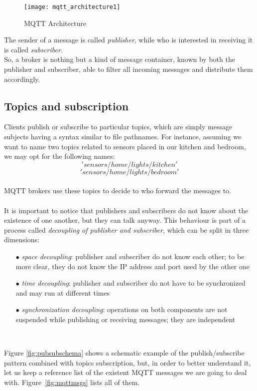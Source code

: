 \documentclass[12pt]{report}
\begin{document}
\begin{figure}[H]
\texttt{[image: mqtt\_architecture1]}
\caption{MQTT Architecture}
\label{fig:mqttArchitecture}
\end{figure}

The sender of a message is called \emph{publisher}, while who is interested in receiving it is called \emph{subscriber}.\\
So, a broker is nothing but a kind of message container, known by both the publisher and subscriber, able to filter all incoming messages and distribute them accordingly.\\

\subsection{Topics and subscription}
\label{ssec:topicsandsub}
\bigskip
Clients publish or subscribe to particular topics, which are simply message subjects having a syntax similar to file pathnames. For instance, assuming we want to name two topics related to sensors placed in our kitchen and bedroom, we may opt for the following names: $$'sensors/home/lights/kitchen'$$ $$'sensors/home/lights/bedroom'$$\\
MQTT brokers use these topics to decide to who forward the messages to.\\\\ 
It is important to notice that publishers and subscribers do not know about the existence of one another, but they can talk anyway.
This behaviour is part of a process called \emph{decoupling of publisher and subscriber}, which can be split in three dimensions:

\begin{itemize}
  \setlength{\itemindent}{+4mm}
  \item[$\bullet$] \emph{space decoupling}: publisher and subscriber do not know each other; to be more clear, they do not know the IP address and port used by the other one
  \item[$\bullet$] \emph{time decoupling}: publisher and subscriber do not have to be synchronized and may run at different times
  \item[$\bullet$] \emph{synchronization decoupling}: operations on both components are not suspended while publishing or receiving messages; they are independent
\end{itemize}\

Figure \ref{fig:pubsubschema} shows a schematic  example of the publish/subscribe pattern combined with topics subscription, but, in order to better understand it, let us keep a reference list of the existent MQTT messages we are going to deal with. Figure~\ref{fig:mqttmsgs} lists all of them.
\end{document}

